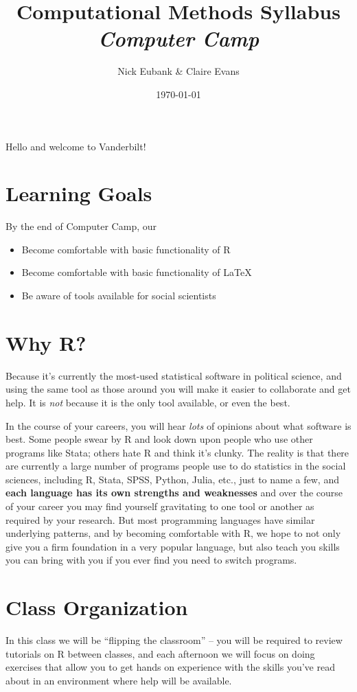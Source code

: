 \documentclass[12pt]{article}
\title{Computational Methods Syllabus \\ \emph{Computer Camp}}
\author{Nick Eubank \& Claire Evans}
\date{\today}
\begin{document}
\maketitle


Hello and welcome to Vanderbilt!

\section{Learning Goals}
By the end of Computer Camp, our
\begin{itemize}
    \item Become comfortable with basic functionality of R
    \item Become comfortable with basic functionality of LaTeX
    \item Be aware of tools available for social scientists
\end{itemize}

\section{Why R?}

Because it's currently the most-used statistical software in political science, and using the same tool as those around you will make it easier to collaborate and get help. It is \emph{not} because it is the only tool available, or even the best.

In the course of your careers, you will hear \emph{lots} of opinions about what software is best. Some people swear by R and look down upon people who use other programs like Stata; others hate R and think it's clunky. The reality is that there are currently a large number of programs people use to do statistics in the social sciences, including R, Stata, SPSS, Python, Julia, etc., just to name a few, and \textbf{each language has its own strengths and weaknesses} and over the course of your career you may find yourself gravitating to one tool or another as required by your research. But most programming languages have similar underlying patterns, and by becoming comfortable with R, we hope to not only give you a firm foundation in a very popular language, but also teach you skills you can bring with you if you ever find you need to switch programs.

\section{Class Organization}

In this class we will be ``flipping the classroom'' -- you will be required to review tutorials on R between classes, and each afternoon we will focus on doing exercises that allow you to get hands on experience with the skills you've read about in an environment where help will be available.
\end{document}
